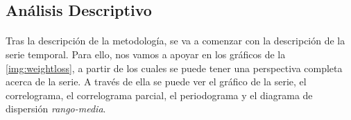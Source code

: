 \documentclass[a4paper, spanish]{article}
\begin{document}
    \subsection{Análisis Descriptivo}
    \label{sec:descriptive}


      \paragraph{}
      Tras la descripción de la metodología, se va a comenzar con la descripción de la serie temporal. Para ello, nos vamos a apoyar en los gráficos de la \autoref{img:weightloss}, a partir de los cuales se puede tener una perspectiva completa acerca de la serie. A través de ella se puede ver el gráfico de la serie, el correlograma, el correlograma parcial, el periodograma y el diagrama de dispersión \emph{rango-media}.
\end{document}
